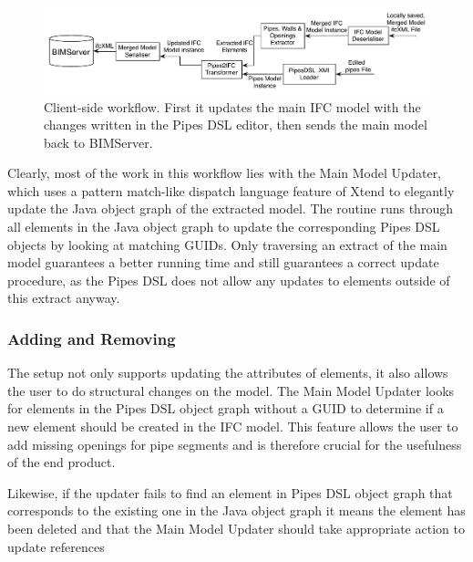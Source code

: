 \begin{figure}[t]
    \centering
        \includegraphics[width=120mm]{images/Pipes2IFC.pdf}
    \caption{Client-side workflow. First it updates the main IFC model with the changes written in the Pipes DSL editor, then sends the main model back to BIMServer.}
    \label{fig:Pipes2IFCWorkflow}
\end{figure}

Clearly, most of the work in this workflow lies with the Main Model Updater, which uses a pattern match-like dispatch language feature of Xtend to elegantly update the Java object graph of the extracted model. The routine runs through all elements in the Java object graph to update the corresponding Pipes DSL objects by looking at matching GUIDs. Only traversing an extract of the main model guarantees a better running time and still guarantees a correct update procedure, as the Pipes DSL does not allow any updates to elements outside of this extract anyway.

\subsubsection{Adding and Removing} The setup not only supports updating the attributes of elements, it also allows the user to do structural changes on the model. The Main Model Updater looks for elements in the Pipes DSL object graph without a GUID to determine if a new element should be created in the IFC model. This feature allows the user to add missing openings for pipe segments and is therefore crucial for the usefulness of the end product.

Likewise, if the updater fails to find an element in Pipes DSL object graph that corresponds to the existing one in the Java object graph it means the element has been deleted and that the Main Model Updater should take appropriate action to update references
